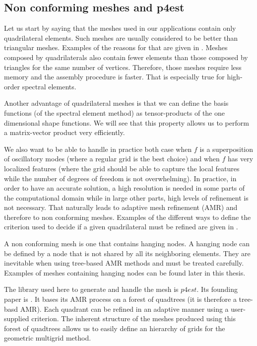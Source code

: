 \subsection*{Non conforming meshes and p4est}

Let us start by saying that the meshes used in our applications contain only quadrilateral elements. Such meshes are usually considered to be better than triangular meshes. Examples of the reasons for that are given in \cite{hexes}. Meshes composed by quadrilaterals also contain fewer elements than those composed by triangles for the same number of vertices. Therefore, those meshes require less memory and the assembly procedure is faster. That is especially true for high-order spectral elements.

Another advantage of quadrilateral meshes is that we can define the basis functions (of the spectral element method) as tensor-products of the one dimensional shape functions. We will see that this property allows us to perform a matrix-vector product very efficiently.  

We also want to be able to handle in practice both case when $f$ is a superposition of oscillatory modes (where a regular grid is the best choice) and when $f$ has very localized features (where the grid should be able to capture the local features while the number of degrees of freedom is not overwhelming). In practice, in order to have an accurate solution, a high resolution is needed in some parts of the computational domain while in large other parts, high levels of refinement is not necessary.  That naturally leads to adaptive mesh refinement (AMR) and therefore to non conforming meshes. Examples of the different ways to define the criterion used to decide if a given quadrilateral must be refined are given in \cite{refine}.

A non conforming mesh is one that contains hanging nodes. A hanging node can be defined by a node that is not shared by all its neighboring elements. They are inevitable when using tree-based AMR methods and must be treated carefully. Examples of meshes containing hanging nodes can be found later in this thesis. 

The library used here to generate and handle the mesh is $p4est$. Its founding paper is \cite{p4est}. It bases its AMR process on a forest of quadtrees (it is therefore a tree-basd AMR). Each quadrant can be refined in an adaptive manner using a user-supplied criterion. The inherent structure of the meshes produced using this forest of quadtrees allows us to easily define an hierarchy of grids for the geometric multigrid method.  


